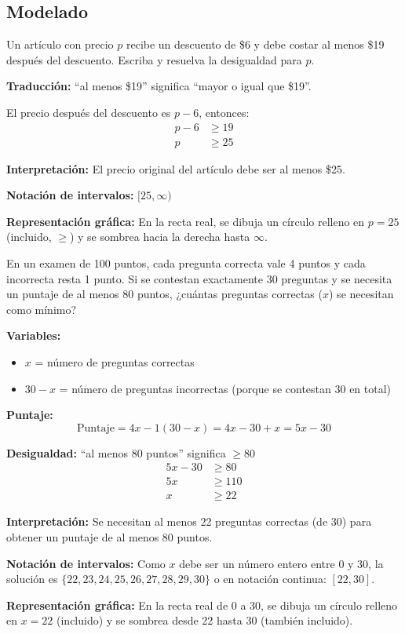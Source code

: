 \subsection*{Modelado}

\begin{exercise}
\problem Un artículo con precio $p$ recibe un descuento de \$6 y debe costar al menos \$19 después del descuento. Escriba y resuelva la desigualdad para $p$.

\begin{solucion}
\textbf{Traducción:} ``al menos \$19'' significa ``mayor o igual que \$19''.

El precio después del descuento es $p - 6$, entonces:
\begin{align*}
p - 6 &\ge 19 \\
p &\ge 25
\end{align*}

\textbf{Interpretación:} El precio original del artículo debe ser al menos \$25.

\textbf{Notación de intervalos:} $[25, \infty)$

\textbf{Representación gráfica:} En la recta real, se dibuja un círculo relleno en $p = 25$ (incluido, $\ge$) y se sombrea hacia la derecha hasta $\infty$.
\end{solucion}

\problem En un examen de 100 puntos, cada pregunta correcta vale 4 puntos y cada incorrecta resta 1 punto. Si se contestan exactamente 30 preguntas y se necesita un puntaje de al menos 80 puntos, ¿cuántas preguntas correctas ($x$) se necesitan como mínimo?

\begin{solucion}
\textbf{Variables:}
\begin{itemize}
    \item $x$ = número de preguntas correctas
    \item $30 - x$ = número de preguntas incorrectas (porque se contestan 30 en total)
\end{itemize}

\textbf{Puntaje:}
\[\text{Puntaje} = 4x - 1(30 - x) = 4x - 30 + x = 5x - 30\]

\textbf{Desigualdad:} ``al menos 80 puntos'' significa $\ge 80$
\begin{align*}
5x - 30 &\ge 80 \\
5x &\ge 110 \\
x &\ge 22
\end{align*}

\textbf{Interpretación:} Se necesitan al menos 22 preguntas correctas (de 30) para obtener un puntaje de al menos 80 puntos.

\textbf{Notación de intervalos:} Como $x$ debe ser un número entero entre 0 y 30, la solución es $\{22, 23, 24, 25, 26, 27, 28, 29, 30\}$ o en notación continua: $[22, 30]$.

\textbf{Representación gráfica:} En la recta real de 0 a 30, se dibuja un círculo relleno en $x = 22$ (incluido) y se sombrea desde 22 hasta 30 (también incluido).
\end{solucion}
\end{exercise}
